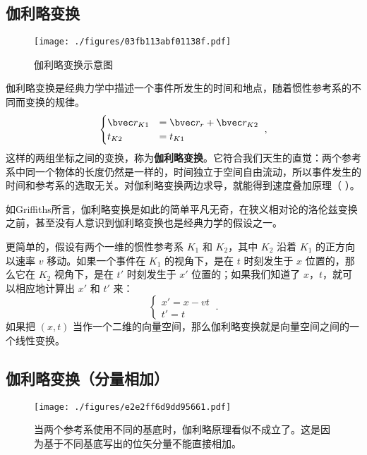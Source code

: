 

\subsection{伽利略变换}
\begin{figure}[ht]
\centering
\texttt{[image: ./figures/03fb113abf01138f.pdf]}
\caption{伽利略变换示意图} \label{fig_GaliTr_1}
\end{figure}

伽利略变换是经典力学中描述一个事件所发生的时间和地点，随着惯性参考系的不同而变换的规律。
\begin{equation}
\begin{cases}
\bvec r_{K1} &= \bvec r_{r}+\bvec r_{K2}\\
t_{K2}&=t_{K1}
\end{cases}~,
\end{equation}
这样的两组坐标之间的变换，称为\textbf{伽利略变换}。它符合我们天生的直觉：两个参考系中同一个物体的长度仍然是一样的，时间独立于空间自由流动，所以事件发生的时间和参考系的选取无关。对伽利略变换两边求导，就能得到速度叠加原理（ ）。

如Griffiths所言，伽利略变换是如此的简单平凡无奇，在狭义相对论的洛伦兹变换之前，甚至没有人意识到伽利略变换也是经典力学的假设之一。

更简单的，假设有两个一维的惯性参考系 $K_1$ 和 $K_2$，其中 $K_2$ 沿着 $K_1$ 的正方向以速率 $v$ 移动。如果一个事件在 $K_1$ 的视角下，是在 $t$ 时刻发生于 $x$ 位置的，那么它在 $K_2$ 视角下，是在 $t'$ 时刻发生于 $x'$ 位置的；如果我们知道了 $x$，$t$，就可以相应地计算出 $x'$ 和 $t'$ 来：
\begin{equation}
\begin{cases}
x' = x - vt\\
t' = t
\end{cases}~.
\end{equation}
如果把 $(x, t)$ 当作一个二维的向量空间，那么伽利略变换就是向量空间之间的一个线性变换。

\subsection{伽利略变换（分量相加）}
\begin{figure}[ht]
\centering
\texttt{[image: ./figures/e2e2ff6d9dd95661.pdf]}
\caption{当两个参考系使用不同的基底时，伽利略原理看似不成立了。这是因为基于不同基底写出的位矢分量不能直接相加。} \label{fig_GaliTr_2}
\end{figure}


